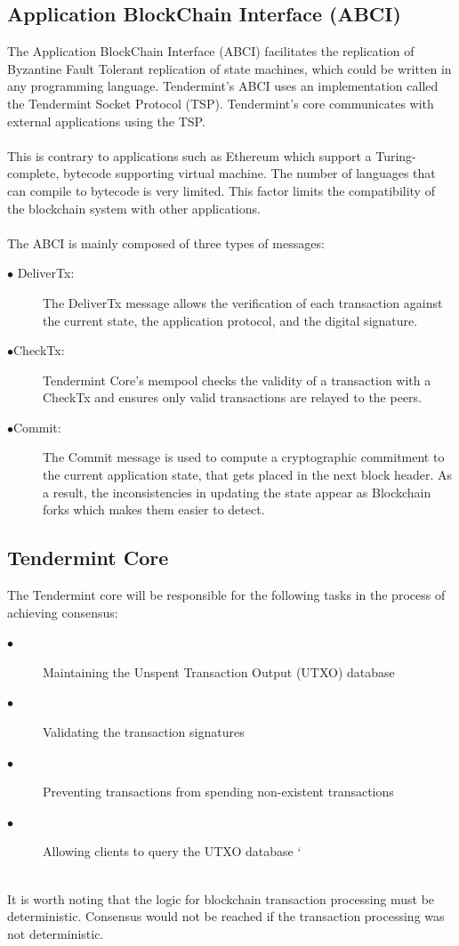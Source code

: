 \documentclass[a4paper,twoside,phd]{BYUPhys}
\begin{document}
\subsection{Application BlockChain Interface (ABCI)}
The Application BlockChain Interface (ABCI) facilitates the replication of Byzantine Fault Tolerant replication of state machines, which could be written in any programming language\cite{}. Tendermint's ABCI uses an implementation called the Tendermint Socket Protocol (TSP)\cite{TendermintTeam2018WhatDocumentation}. Tendermint's core communicates with external applications using the TSP\cite{}.
\\
\\
This is contrary to applications such as Ethereum which support a Turing-complete, bytecode supporting virtual machine\cite{Wood2018ETHEREUM:LEDGER}. The number of languages that can compile to bytecode is very limited. This factor limits the compatibility of the blockchain system with other applications.
\\
\\
The ABCI is mainly composed of three types of messages\cite{TendermintTeam2018WhatDocumentation}:
\begin{description}
\item[$\bullet$ DeliverTx:] The DeliverTx message allows the verification of each transaction against the current state,  the application protocol, and the digital signature.
\item[$\bullet$CheckTx:] Tendermint Core's mempool checks the validity of a transaction with a CheckTx and ensures only valid transactions are relayed to the peers.
\item[$\bullet$Commit:] The Commit message is used to compute a cryptographic commitment to the current application state, that gets placed in the next block header. As a result, the inconsistencies in updating the state appear as Blockchain forks which makes them easier to detect.
\end{description}

\subsection{Tendermint Core}
The Tendermint core will be responsible for the following tasks in the process of achieving consensus\cite{TendermintTeam2018WhatDocumentation}:
\begin{description}
\item[$\bullet$]Maintaining the Unspent Transaction Output (UTXO) database
\item[$\bullet$]Validating the transaction signatures
\item[$\bullet$]Preventing transactions from spending non-existent transactions
\item[$\bullet$]Allowing clients to query the UTXO database
`
\end{description}
\\
It is worth noting that the logic for blockchain transaction processing must be deterministic. Consensus would not be reached if the transaction processing was not deterministic\cite{TendermintTeam2018WhatDocumentation}. 
\label{chap:LitReview}
\end{document}
